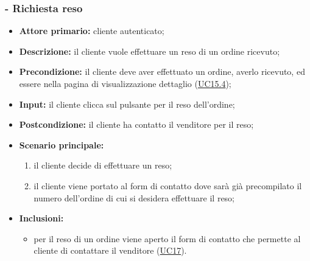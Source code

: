 \subsubsection{ - Richiesta reso}
\begin{itemize}
    \item \textbf{Attore primario:} cliente autenticato;
    \item \textbf{Descrizione:} il cliente vuole effettuare un reso di un ordine ricevuto;
    \item \textbf{Precondizione:} il cliente deve aver effettuato un ordine, averlo ricevuto, ed essere nella pagina di visualizzazione dettaglio (\hyperref[UC15.4]{UC15.4});
    \item \textbf{Input:} il cliente clicca sul pulsante per il reso dell'ordine;
    \item \textbf{Postcondizione:} il cliente ha contatto il venditore per il reso;
    \item \textbf{Scenario principale:}
          \begin{enumerate}
              \item il cliente decide di effettuare un reso;
              \item il cliente viene portato al form di contatto dove sarà già precompilato il numero dell'ordine di cui si desidera effettuare il reso;
          \end{enumerate}
    \item \textbf{Inclusioni:}
          \begin{itemize}
              \item per il reso di un ordine viene aperto il form di contatto che permette al cliente di contattare il venditore (\hyperref[UC17]{UC17}).
          \end{itemize}
\end{itemize}

\stepsubUserCase
